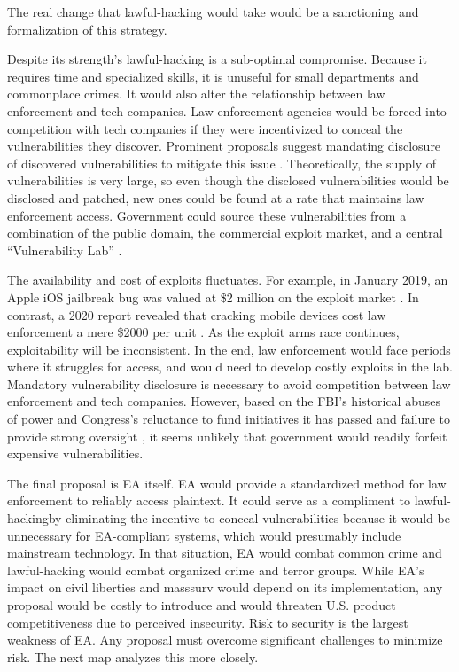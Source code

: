 The real change that \ac{lawful-hacking} would take would be a sanctioning and formalization of this strategy.

Despite its strength's \ac{lawful-hacking} is a sub-optimal compromise. Because it requires time and specialized skills,
it is unuseful for small departments and commonplace crimes. It would also alter the relationship between law
enforcement and tech companies. Law enforcement agencies would be forced into competition with tech companies if they
were incentivized to conceal the vulnerabilities they discover. Prominent proposals suggest mandating disclosure of
discovered vulnerabilities to mitigate this issue \cite{bellovin_lawful_2013} \cite{hennessey_lawful_2016}.
Theoretically, the supply of vulnerabilities is very large, so even though the disclosed vulnerabilities would be
disclosed and patched, new ones could be found at a rate that maintains law enforcement access. Government could source
these vulnerabilities from a combination of the public domain, the commercial exploit market, and a central
``Vulnerability Lab'' \cite{bellovin_lawful_2013}.

The availability and cost of exploits fluctuates. For example, in January 2019, an Apple iOS jailbreak bug was valued at
\$2 million on the exploit market \cite{goodin_zeroday_2019}. In contrast, a 2020 report revealed that cracking mobile
devices cost law enforcement a mere \$2000 per unit \cite{koepke_2020}. As the exploit arms race continues,
exploitability will be inconsistent. In the end, law enforcement would face periods where it struggles for access, and
would need to develop costly exploits in the lab. Mandatory vulnerability disclosure is necessary to avoid competition
between law enforcement and tech companies. However, based on the \ac{FBI}'s historical abuses of power
\cite{shamsi_2011} and Congress's reluctance to fund initiatives it has passed \cite{keller_internet_2019} and failure
to provide strong oversight \cite{johnson_congressional_2004}, it seems unlikely that government would readily forfeit
expensive vulnerabilities.

The final proposal is \ac{EA} itself. \ac{EA} would provide a standardized method for law enforcement to reliably access
\ac{plaintext}. It could serve as a compliment to \ac{lawful-hacking}by eliminating the incentive to conceal
vulnerabilities because it would be unnecessary for \ac{EA}-compliant systems, which would presumably include mainstream
technology. In that situation, \ac{EA} would combat common crime and \ac{lawful-hacking} would combat organized crime
and terror groups. While \ac{EA}'s impact on civil liberties and \ac{masssurv} would depend on its implementation, any
proposal would be costly to introduce and would threaten U.S. product competitiveness due to perceived insecurity. Risk
to security is the largest weakness of \ac{EA}. Any proposal must overcome significant challenges to minimize risk. The
next map analyzes this more closely.


